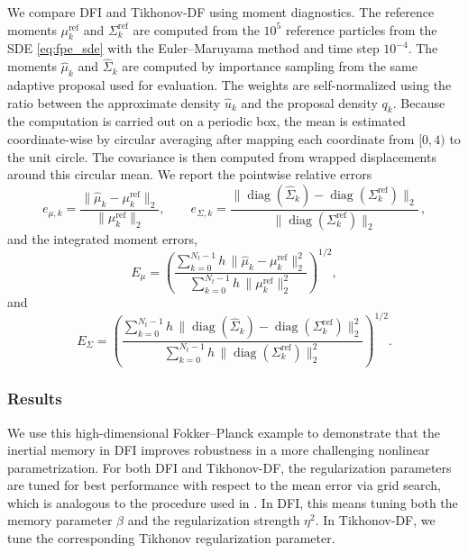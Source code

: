 \documentclass[oneside,11pt]{article}
\theoremstyle{remark}
\theoremstyle{thmstyleone}
\theoremstyle{thmstylethree}
\theoremstyle{thmstyletwo}
\newcommand{\norm}[1]{\lVert #1\rVert}
\begin{document}
We compare DFI and Tikhonov-DF using moment diagnostics. The reference moments $\mu_k^{\mathrm{ref}}$ and $\Sigma_k^{\mathrm{ref}}$ are computed from the $10^5$ reference particles from the SDE \eqref{eq:fpe_sde} with the Euler--Maruyama method and time step $10^{-4}$. The moments $\widehat\mu_k$ and $\widehat\Sigma_k$ are computed by importance sampling from the same adaptive proposal used for evaluation. The weights are self-normalized using the ratio between the approximate density $\hat u_k$ and the proposal density $q_k$. Because the computation is carried out on a periodic box, the mean is estimated
coordinate-wise by circular averaging after mapping each coordinate from
$[0,4)$ to the unit circle. The covariance is then computed from wrapped
displacements around this circular mean. We report the pointwise relative errors
\begin{equation}
    e_{\mu,k}
    =
    \frac{
        \norm{\widehat\mu_k-\mu_k^{\mathrm{ref}}}_2
    }{
        \norm{\mu_k^{\mathrm{ref}}}_2
    },
    \qquad
    e_{\Sigma,k}
    =
    \frac{
        \norm{
            \operatorname{diag}(\widehat\Sigma_k)
            -
            \operatorname{diag}(\Sigma_k^{\mathrm{ref}})
        }_2
    }{
        \norm{
            \operatorname{diag}(\Sigma_k^{\mathrm{ref}})
        }_2
    }\,,
    \label{eq:NumExp:FPEPointwiseMomentErrors}
\end{equation}
and the integrated moment errors,
\begin{equation*}
    E_\mu
    =
    \left(
    \frac{
        \sum_{k=0}^{N_t-1}h\,
        \norm{\widehat\mu_k-\mu_k^{\mathrm{ref}}}_2^2
    }{
        \sum_{k=0}^{N_t-1}h\,
        \norm{\mu_k^{\mathrm{ref}}}_2^2
    }
    \right)^{1/2},
\end{equation*}
and
\begin{equation*}
    E_\Sigma
    =
    \left(
    \frac{
        \sum_{k=0}^{N_t-1}h\,
        \norm{
            \operatorname{diag}(\widehat\Sigma_k)
            -
            \operatorname{diag}(\Sigma_k^{\mathrm{ref}})
        }_2^2
    }{
        \sum_{k=0}^{N_t-1}h\,
        \norm{
            \operatorname{diag}(\Sigma_k^{\mathrm{ref}})
        }_2^2
    }
    \right)^{1/2}.
\end{equation*}

\subsubsection{Results}
We use this high-dimensional Fokker--Planck example to demonstrate that the inertial memory in DFI improves robustness in a more challenging nonlinear parametrization. For both DFI and Tikhonov-DF, the regularization parameters are tuned for best performance with respect to the mean error via grid search, which is analogous to the procedure used in . In DFI, this means tuning both the memory parameter $\beta$ and the regularization strength $\eta^2$. In Tikhonov-DF, we tune the corresponding Tikhonov regularization parameter.
\end{document}

